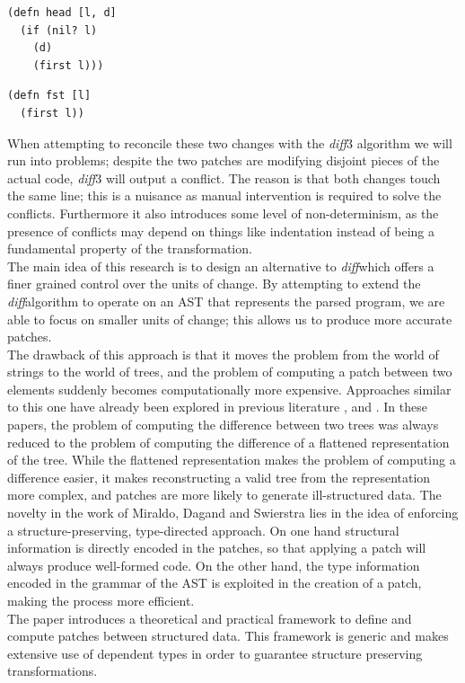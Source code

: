 \documentclass[11pt, titlepage]{article}
\newcommand{\diff}{\emph{diff}}
\begin{document}
\begin{verbatim}
(defn head [l, d]
  (if (nil? l)
    (d)
    (first l)))
\end{verbatim}

\begin{verbatim}
(defn fst [l]
  (first l))
\end{verbatim}

When attempting to reconcile these two changes with the \diff3 algorithm we will run into problems; despite the two patches are modifying disjoint pieces of the actual code, \diff3 will output a conflict. 
The reason is that both changes touch the same line; this is a nuisance as manual intervention is required to solve the conflicts. Furthermore it also introduces some level of non-determinism, as the presence of conflicts may depend on things like indentation instead of being a fundamental property of the transformation. 
\\
The main idea of this research is to design an alternative to \diff which offers a finer grained control over the units of change. By attempting to extend the \diff algorithm to operate on an AST that represents the parsed program, we are able to focus on smaller units of change; this allows us to produce more accurate patches. 
\\
The drawback of this approach is that it moves the problem from the world of strings to the world of trees, and the problem of computing a patch between two elements suddenly becomes computationally more expensive. 
Approaches similar to this one have already been explored in previous literature \cite{semantics-VC}, \cite{structure-aware-VC} and \cite{vassena}. In these papers, the problem of computing the difference between two trees was always reduced to the problem of computing the difference of a flattened representation of the tree. 
While the flattened representation makes the problem of computing a difference easier, it makes reconstructing a valid tree from the representation more complex, and patches are more likely to generate ill-structured data.  
The novelty in the work of Miraldo, Dagand and Swierstra \cite{type-directed-diff} lies in the idea of enforcing a structure-preserving, type-directed approach. 
On one hand structural information is directly encoded in the patches, so that applying a patch will always produce well-formed code. 
On the other hand, the type information encoded in the grammar of the AST is 
exploited in the creation of a patch, making the process more efficient.
\\
The paper introduces a theoretical and practical framework to define and compute patches between structured data. This framework is generic and makes extensive use of dependent 
types in order to guarantee structure preserving transformations.
\end{document}
